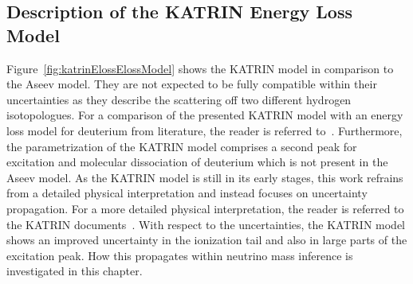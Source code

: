 \subsection{Description of the KATRIN Energy Loss Model}
Figure~\ref{fig:katrinElossElossModel} shows the KATRIN model in comparison to the Aseev model. They are not expected to be fully compatible within their uncertainties as they describe the scattering off two different hydrogen isotopologues. For a comparison of the presented KATRIN model with an energy loss model for deuterium from literature, the reader is referred to~\cite{Rodenbeck2019}. Furthermore, the parametrization of the KATRIN model comprises a second peak for excitation and molecular dissociation of deuterium which is not present in the Aseev model. As the KATRIN model is still in its early stages, this work refrains from a detailed physical interpretation and instead focuses on uncertainty propagation. For a more detailed physical interpretation, the reader is referred to the KATRIN documents~\cite{Rodenbeck2019,Hannen2019_1,Hannen2019_2}. With respect to the uncertainties, the KATRIN model shows an improved uncertainty in the ionization tail and also in large parts of the excitation peak. How this propagates within neutrino mass inference is investigated in this chapter.

